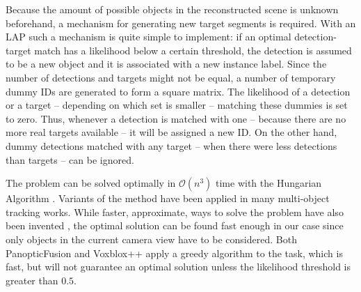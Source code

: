 Because the amount of possible objects in the reconstructed scene is unknown beforehand, a mechanism for generating new target segments is required. With an LAP such a mechanism is quite simple to implement: if an optimal detection-target match has a likelihood below a certain threshold, the detection is assumed to be a new object and it is associated with a new instance label. Since the number of detections and targets might not be equal, a number of temporary dummy IDs are generated to form a square matrix. The likelihood of a detection or a target -- depending on which set is smaller -- matching these dummies is set to zero. Thus, whenever a detection is matched with one -- because there are no more real targets available -- it will be assigned a new ID. On the other hand, dummy detections matched with any target -- when there were less detections than targets -- can be ignored.

The problem can be solved optimally in $\mathcal{O}(n^3)$ time with the Hungarian Algorithm \cite{hungarian}. Variants of the method have been applied in many multi-object tracking works. While faster, approximate, ways to solve the problem have also been invented \cite{probabilistic_3d_mot,two_stage_data_association,panopticfusion}, the optimal solution can be found fast enough in our case since only objects in the current camera view have to be considered. Both PanopticFusion \cite{panopticfusion} and Voxblox++ \cite{voxblox++} apply a greedy algorithm to the task, which is fast, but will not guarantee an optimal solution unless the likelihood threshold is greater than $0.5$. \cite{panoptic_segmentation}
